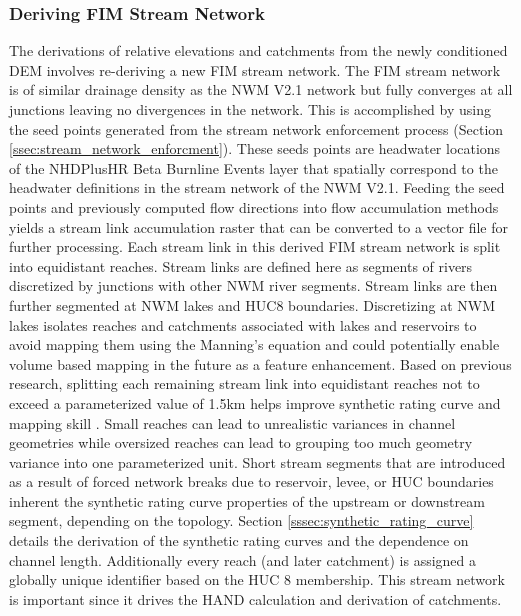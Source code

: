 \subsubsection{Deriving FIM Stream Network}
\label{sssec:deriving_fim_stream_network}
%
The derivations of relative elevations and catchments from the newly conditioned DEM involves re-deriving a new FIM stream network. 
The FIM stream network is of similar drainage density as the NWM V2.1 network but fully converges at all junctions leaving no divergences in the network.
This is accomplished by using the seed points generated from the stream network enforcement process (Section \ref{ssec:stream_network_enforcment}).
These seeds points are headwater locations of the NHDPlusHR Beta Burnline Events layer that spatially correspond to the headwater definitions in the stream network of the NWM V2.1.
Feeding the seed points and previously computed flow directions into flow accumulation methods \cite{wallis2009parallel,tarboton1997new,tarboton2005terrain} yields a stream link accumulation raster that can be converted to a vector file for further processing.
Each stream link in this derived FIM stream network is split into equidistant reaches.
Stream links are defined here as segments of rivers discretized by junctions with other NWM river segments.
Stream links are then further segmented at NWM lakes and HUC8 boundaries.
Discretizing at NWM lakes isolates reaches and catchments associated with lakes and reservoirs to avoid mapping them using the Manning's equation and could potentially enable volume based mapping in the future as a feature enhancement.
Based on previous research, splitting each remaining stream link into equidistant reaches not to exceed a parameterized value of 1.5km helps improve synthetic rating curve and mapping skill \cite{garousi2019terrain,godbout2019error,zheng2018geoflood}.
Small reaches can lead to unrealistic variances in channel geometries while oversized reaches can lead to grouping too much geometry variance into one parameterized unit.
Short stream segments that are introduced as a result of forced network breaks due to reservoir, levee, or HUC boundaries inherent the synthetic rating curve properties of the upstream or downstream segment, depending on the topology.
Section \ref{sssec:synthetic_rating_curve} details the derivation of the synthetic rating curves and the dependence on channel length. 
Additionally every reach (and later catchment) is assigned a globally unique identifier based on the HUC 8 membership.
This stream network is important since it drives the HAND calculation and derivation of catchments.
%
